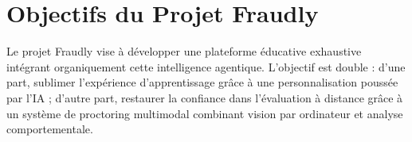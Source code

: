 \section{Objectifs du Projet Fraudly}
Le projet Fraudly vise à développer une plateforme éducative exhaustive intégrant organiquement cette intelligence agentique. L'objectif est double : d'une part, sublimer l'expérience d'apprentissage grâce à une personnalisation poussée par l'IA ; d'autre part, restaurer la confiance dans l'évaluation à distance grâce à un système de proctoring multimodal combinant vision par ordinateur et analyse comportementale.
